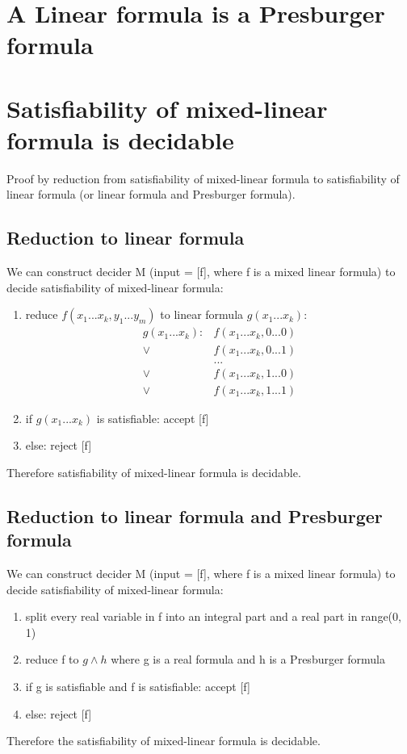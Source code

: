 \documentclass{article}
\begin{document}
\section{A Linear formula is a Presburger formula}

\section{Satisfiability of mixed-linear formula is decidable}

Proof by reduction from satisfiability of mixed-linear formula to 
satisfiability of linear formula (or linear formula and Presburger formula).

\subsection{Reduction to linear formula}
We can construct decider M (input = [f], where f is a mixed linear formula) to 
decide satisfiability of mixed-linear formula:
\begin{enumerate}
	\item reduce $ f(x_1 ... x_k, y_1 ... y_m) $ to linear formula $ g(x_1 ... 
	x_k) $:
	\begin{align*}
		g(x_1 ... x_k):& f(x_1 ... x_k, 0 ... 0) \\
		 \lor& f(x_1 ... x_k, 0 ... 1) \\
		& ... \\
		\lor& f(x_1 ... x_k, 1 ... 0) \\
		\lor& f(x_1 ... x_k, 1 ... 1)
	\end{align*}
	\item if $ g(x_1 ... x_k) $ is satisfiable: accept [f]
	\item else: reject [f]
\end{enumerate}
Therefore satisfiability of mixed-linear formula is decidable.

\subsection{Reduction to linear formula and Presburger formula}
We can construct decider M (input = [f], where f is a mixed linear formula) to 
decide satisfiability of mixed-linear formula:
\begin{enumerate}
	\item split every real variable in f into an integral part and a real 
	part in range(0, 1)
	\item reduce f to $ g \land h $ where g is a real formula and h is a 
	Presburger formula
	\item if g is satisfiable and f is satisfiable: accept [f]
	\item else: reject [f]
\end{enumerate}
Therefore the satisfiability of mixed-linear formula is decidable.
\end{document}
